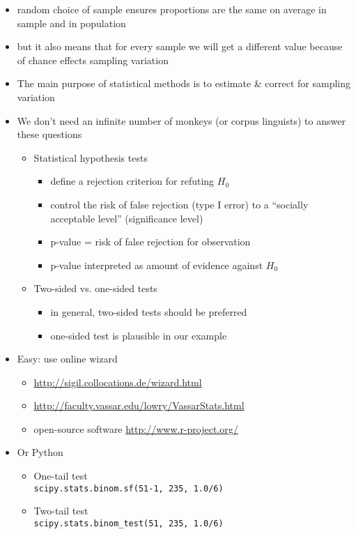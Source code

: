 \documentclass[a4paper,landscape,headrule,footrule,dvips]{foils}
\begin{document}
\begin{CJK}{UTF8}{min}
\begin{itemize}
\item random choice of sample ensures proportions are the
  same on average in sample and in population
\item but it also means that for every sample we will get a
different value because of chance effects
\into sampling variation
\item The main purpose of statistical methods is to
estimate \& correct for sampling variation
\end{itemize}
\begin{itemize}
\item We don't need an infinite number of monkeys
(or corpus linguists) to answer these questions
\begin{itemize}
\item Statistical hypothesis tests
\begin{itemize}
\item define a rejection criterion for refuting $H_0$
\item control the risk of false rejection (type I error) to a
“socially acceptable level” (significance level)
\item p-value = risk of false rejection for observation
\item p-value interpreted as amount of evidence against $H_0$
\end{itemize}
\item Two-sided vs. one-sided tests
\begin{itemize}
\item in general, two-sided tests should be preferred
\item one-sided test is plausible in our example
\end{itemize}
\end{itemize}
\end{itemize}


\begin{itemize}
\item Easy: use online wizard
  \begin{itemize}
  \item \url{http://sigil.collocations.de/wizard.html}
  \item \url{http://faculty.vassar.edu/lowry/VassarStats.html}
  \item open-source software \url{http://www.r-project.org/}
\end{itemize}
\item Or Python
  \begin{itemize}
  \item One-tail test 
    \\ \texttt{scipy.stats.binom.sf(51-1, 235, 1.0/6)}
  \item Two-tail test
    \\ \texttt{scipy.stats.binom\_test(51, 235, 1.0/6)}
  \end{itemize}
\end{itemize}



\end{CJK}
\end{document}
